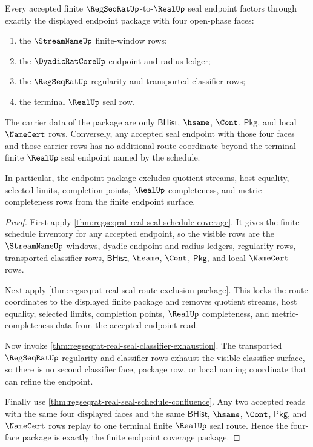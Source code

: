 \begin{theorem}
\label{thm:regseqrat-real-seal-endpoint-coverage}
Every accepted finite $\RegSeqRatUp$-to-$\RealUp$ seal endpoint factors through
exactly the displayed endpoint package with four open-phase faces:
\begin{enumerate}
  \item the $\StreamNameUp$ finite-window rows;
  \item the $\DyadicRatCoreUp$ endpoint and radius ledger;
  \item the $\RegSeqRatUp$ regularity and transported classifier rows;
  \item the terminal $\RealUp$ seal row.
\end{enumerate}
The carrier data of the package are only $\mathsf{BHist}$, $\hsame$, $\Cont$,
$\mathsf{Pkg}$, and local $\NameCert$ rows. Conversely, any accepted seal
endpoint with those four faces and those carrier rows has no additional route
coordinate beyond the terminal finite $\RealUp$ seal endpoint named by the
schedule.

In particular, the endpoint package excludes quotient streams, host equality,
selected limits, completion points, $\RealUp$ completeness, and
metric-completeness rows from the finite endpoint surface.
\end{theorem}
\begin{proof}
First apply \autoref{thm:regseqrat-real-seal-schedule-coverage}. It gives the
finite schedule inventory for any accepted endpoint, so the visible rows are
the $\StreamNameUp$ windows, dyadic endpoint and radius ledgers, regularity
rows, transported classifier rows, $\mathsf{BHist}$, $\hsame$, $\Cont$,
$\mathsf{Pkg}$, and local $\NameCert$ rows.

Next apply \autoref{thm:regseqrat-real-seal-route-exclusion-package}. This
locks the route coordinates to the displayed finite package and removes
quotient streams, host equality, selected limits, completion points,
$\RealUp$ completeness, and metric-completeness data from the accepted
endpoint read.

Now invoke \autoref{thm:regseqrat-real-seal-classifier-exhaustion}. The
transported $\RegSeqRatUp$ regularity and classifier rows exhaust the visible
classifier surface, so there is no second classifier face, package row, or
local naming coordinate that can refine the endpoint.

Finally use \autoref{thm:regseqrat-real-seal-schedule-confluence}. Any two
accepted reads with the same four displayed faces and the same
$\mathsf{BHist}$, $\hsame$, $\Cont$, $\mathsf{Pkg}$, and $\NameCert$ rows
replay to one terminal finite $\RealUp$ seal route. Hence the four-face
package is exactly the finite endpoint coverage package.
\end{proof}

